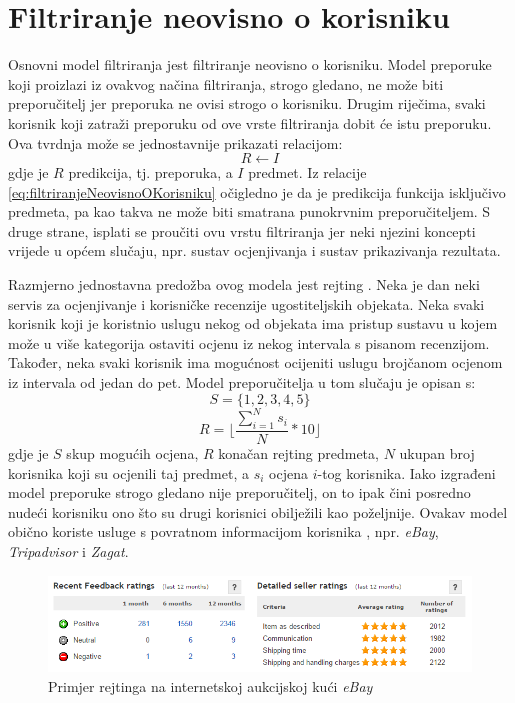 \documentclass[times, utf8, diplomski, numeric]{fer}
\begin{document}
\section{Filtriranje neovisno o korisniku}
Osnovni model filtriranja jest filtriranje neovisno o korisniku. Model preporuke
koji proizlazi iz ovakvog načina filtriranja, strogo gledano, ne može biti
preporučitelj jer preporuka ne ovisi strogo o korisniku. Drugim riječima, svaki
korisnik koji zatraži preporuku od ove vrste filtriranja dobit će istu
preporuku. Ova tvrdnja može se jednostavnije prikazati relacijom:
\begin{equation}
\label{eq:filtriranjeNeovisnoOKorisniku}
	R \leftarrow I
\end{equation}
gdje je $R$ predikcija, tj. preporuka, a $I$ predmet. Iz relacije
\ref{eq:filtriranjeNeovisnoOKorisniku} očigledno je da je predikcija funkcija
isključivo predmeta, pa kao takva ne može biti smatrana punokrvnim
preporučiteljem. S druge strane, isplati se proučiti ovu vrstu filtriranja jer
neki njezini koncepti vrijede u općem slučaju, npr. sustav ocjenjivanja i sustav
prikazivanja rezultata.

Razmjerno jednostavna predožba ovog modela jest rejting . Neka je
dan neki servis za ocjenjivanje i korisničke recenzije ugostiteljskih objekata.
Neka svaki korisnik koji je koristnio uslugu nekog od objekata ima pristup
sustavu u kojem može u više kategorija ostaviti ocjenu iz nekog intervala s
pisanom recenzijom. Također, neka svaki korisnik ima mogućnost ocijeniti uslugu
brojčanom ocjenom iz intervala od jedan do pet. Model preporučitelja u tom
slučaju je opisan s:
\begin{equation}
\label{eq:skupOcjena}
	S = \{1, 2, 3, 4, 5\}
\end{equation}
\begin{equation}
\label{eq:prosjek}
	R = \lfloor \frac{\sum_{i=1}^{N} s_i}{N} \ast 10 \rfloor
\end{equation}
gdje je $S$ skup mogućih ocjena, $R$ konačan rejting predmeta, $N$ ukupan broj
korisnika koji su ocjenili taj predmet, a $s_i$ ocjena $i$-tog korisnika. Iako
izgrađeni model preporuke strogo gledano nije preporučitelj, on to ipak čini
posredno nudeći korisniku ono što su drugi korisnici obilježili kao poželjnije.
Ovakav model obično koriste usluge s povratnom informacijom korisnika
, npr. \emph{eBay}, \emph{Tripadvisor} i \emph{Zagat}.

\begin{figure}[!htb]
	\centering
	\includegraphics[width=14.21cm]{images/neosobni/ebay1.png}
	\caption{Primjer rejtinga na internetskoj aukcijskoj kući \emph{eBay}}
	\label{fig:Ebay1}
\end{figure}
\end{document}
